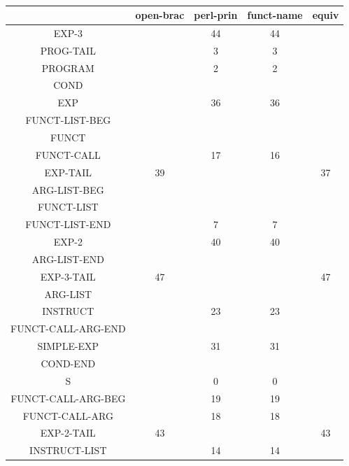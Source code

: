 \documentclass[a4paper,10pt]{article}
\begin{document}
 
 ~\\
 
\begin{tabular}{|c|c|c|c|c|}	
\hline
&	open-brac&	perl-prin&	funct-name&	equiv \\ \hline
EXP-3				& 	& 44& 44&  \\ \hline 
PROG-TAIL			& 	& 3	& 3	&  \\ \hline 
PROGRAM				& 	& 2	& 2	&  \\ \hline 
COND				& 	& 	& 	&  \\ \hline 
EXP					& 	& 36& 36&  \\ \hline 
FUNCT-LIST-BEG		& 	& 	& 	&  \\ \hline 
FUNCT				& 	& 	& 	&  \\ \hline 
FUNCT-CALL			& 	& 17& 16&  \\ \hline 
EXP-TAIL			& 39& 	& 	& 37 \\ \hline 
ARG-LIST-BEG		& 	& 	& 	&  \\ \hline 
FUNCT-LIST			& 	& 	& 	&  \\ \hline 
FUNCT-LIST-END		& 	& 7	& 7	&  \\ \hline 
EXP-2				& 	& 40& 40&  \\ \hline 
ARG-LIST-END		&	& 	& 	&  \\ \hline 
EXP-3-TAIL			& 47& 	& 	& 47 \\ \hline 
ARG-LIST			& 	& 	& 	&  \\ \hline 
INSTRUCT			& 	& 23& 23&  \\ \hline 
FUNCT-CALL-ARG-END	& 	& 	& 	&  \\ \hline 
SIMPLE-EXP			& 	& 31& 31&  \\ \hline 
COND-END			& 	& 	& 	&  \\ \hline 
S					& 	& 0	& 0	&  \\ \hline 
FUNCT-CALL-ARG-BEG	& 	& 19& 19&  \\ \hline 
FUNCT-CALL-ARG		& 	& 18& 18&  \\ \hline 
EXP-2-TAIL			& 43& 	& 	& 43 \\ \hline 
INSTRUCT-LIST		& 	& 14& 14&  \\ \hline 

\end{tabular} 
 
\end{document}
